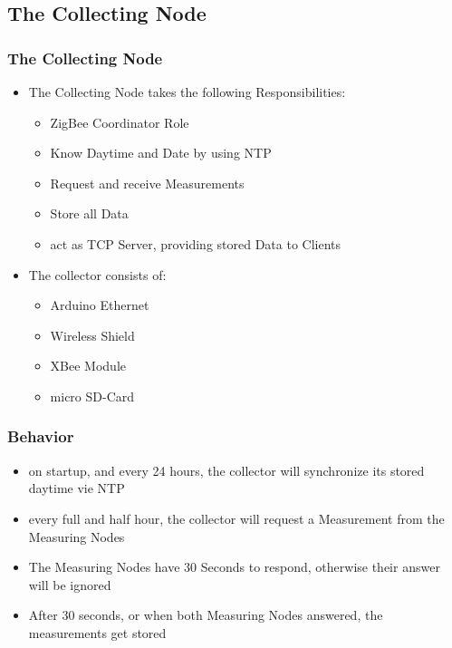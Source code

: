 \documentclass{beamer}
\begin{document}
\subsection{The Collecting Node}
\begin{frame}
	\frametitle{The Collecting Node}
	\begin{itemize}
		\item The Collecting Node takes the following Responsibilities:
		\begin{itemize}
			\item ZigBee Coordinator Role
			\item Know Daytime and Date by using NTP
			\item Request and receive Measurements
			\item Store all Data
			\item act as TCP Server, providing stored Data to Clients
		\end{itemize}
		\item The collector consists of:
		\begin{itemize}
			\item Arduino Ethernet
			\item Wireless Shield
			\item XBee Module
			\item micro SD-Card
		\end{itemize}
	\end{itemize}
\end{frame}




\begin{frame}
	\frametitle{Behavior}
	\begin{itemize}
		\item on startup, and every 24 hours, the collector will synchronize its stored daytime vie NTP
		\item every full and half hour, the collector will request a Measurement from the Measuring Nodes
		\item The Measuring Nodes have 30 Seconds to respond, otherwise their answer will be ignored
		\item After 30 seconds, or when both Measuring Nodes answered, the measurements get stored
	\end{itemize}
\end{frame}
\end{document}
